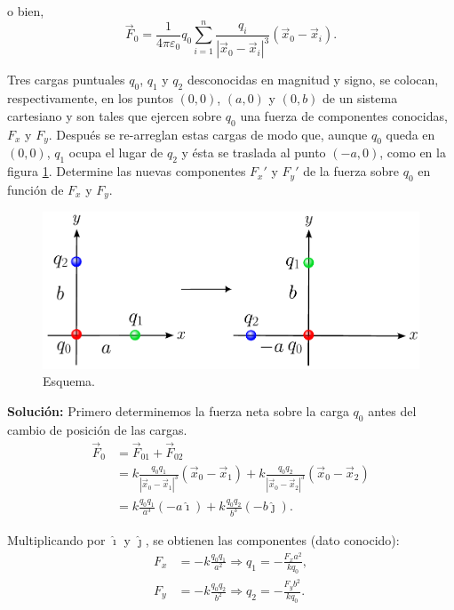 o bien,
$$\vec{F}_0 = \frac{1}{4\pi \varepsilon_0} q_0 \sum_{i=1}^n \frac{q_i}{|\vec{x}_0 - \vec{x}_i|^3} (\vec{x}_0 - \vec{x}_i).$$

\begin{ejemplo}
   Tres cargas puntuales $q_0$, $q_1$ y $q_2$ desconocidas en magnitud y signo, se colocan, respectivamente, en los puntos $(0,0)$, $(a,0)$ y $(0,b)$ de un sistema cartesiano y son tales que ejercen sobre $q_0$ una fuerza de componentes conocidas, $F_x$ y $F_y$. Después se re-arreglan  estas cargas de modo que, aunque $q_0$ queda en $(0,0)$, $q_1$ ocupa el lugar de $q_2$ y ésta se traslada al punto $(-a,0)$, como en la figura \ref{fig:Ej-Principio-Superposicion}. Determine las nuevas componentes $F_x'$ y $F_y'$ de la fuerza sobre $q_0$ en función de $F_x$ y $F_y$.

\begin{figure}[H]
    \centering
    \includegraphics[scale = 0.6]{Figuras/Ej-Principio-Superposicion.pdf}
    \caption{Esquema.}
    \label{fig:Ej-Principio-Superposicion}
\end{figure}

\textbf{Solución:} Primero determinemos la fuerza neta sobre la carga $q_0$ antes del cambio de posición de las cargas.
\begin{align*}
    \vec{F}_0 &= \vec{F}_{01} + \vec{F}_{02} \\
&= k \frac{q_0q_1}{|\vec{x}_0 - \vec{x}_1|^3} (\vec{x}_0- \vec{x}_1) + k \frac{q_0q_2}{|\vec{x}_0 - \vec{x}_2|^3} (\vec{x}_0- \vec{x}_2) \\
&= k \frac{q_0q_1}{a^3} (-a \hat{\imath}) + k \frac{q_0q_2}{b^3} (-b \hat{\jmath}).
\end{align*}

Multiplicando por $\hat{\imath}$ y $\hat{\jmath}$, se obtienen las componentes (dato conocido):
\begin{align*}
    F_x &= - k \frac{q_0q_1}{a^2} \Rightarrow  q_1 = - \frac{F_x a^2}{k q_0}, \\
F_y &= - k \frac{q_0q_2}{b^2} \Rightarrow  q_2 = - \frac{F_y b^2}{k q_0}.
\end{align*}


\end{ejemplo}
